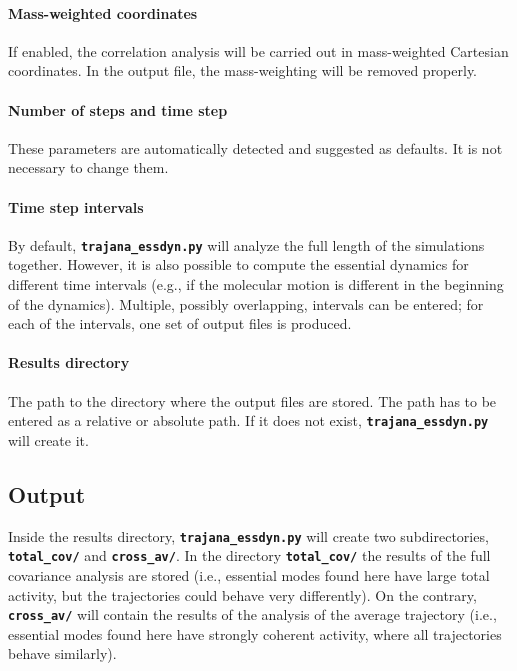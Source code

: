 \documentclass[a4paper,10pt,DIV=15,openany,twoside=false]{scrbook}
\newcommand{\ttt}[1]{\textbf{\texttt{#1}}}
\begin{document}
\paragraph{Mass-weighted coordinates}

If enabled, the correlation analysis will be carried out in mass-weighted Cartesian coordinates.
In the output file, the mass-weighting will be removed properly.

\paragraph{Number of steps and time step}

These parameters are automatically detected and suggested as defaults.
It is not necessary to change them.

\paragraph{Time step intervals}

By default, \ttt{trajana\_essdyn.py} will analyze the full length of the simulations together. 
However, it is also possible to compute the essential dynamics for different time intervals (e.g., if the molecular motion is different in the beginning of the dynamics).
Multiple, possibly overlapping, intervals can be entered; for each of the intervals, one set of output files is produced.

\paragraph{Results directory}

The path to the directory where the output files are stored.
The path has to be entered as a relative or absolute path.
If it does not exist, \ttt{trajana\_essdyn.py} will create it.

\subsection{Output}

Inside the results directory, \ttt{trajana\_essdyn.py} will create two subdirectories, \ttt{total\_cov/} and \ttt{cross\_av/}.
In the directory \ttt{total\_cov/} the results of the full covariance analysis are stored (i.e., essential modes found here have large total activity, but the trajectories could behave very differently).
On the contrary, \ttt{cross\_av/} will contain the results of the analysis of the average trajectory (i.e., essential modes found here have strongly coherent activity, where all trajectories behave similarly).
\end{document}
